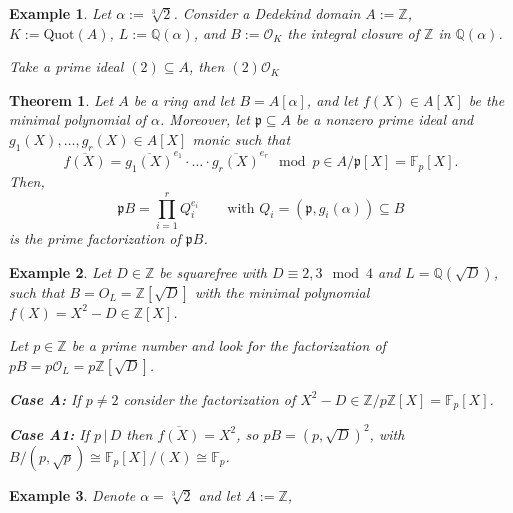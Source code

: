 \documentclass[a4paper]{book}
\theoremstyle{break}
\newtheorem{example}{Example}
\theoremstyle{plain}
\newtheorem{theorem}{Theorem}[definition]
\begin{document}
\begin{example}
    Let \(\alpha := \sqrt[3]{2}\). Consider a Dedekind domain \(A := \mathbb{Z}\), \(K := \text{Quot}(A)\), \(L := \mathbb{Q}(\alpha)\), and \(B := \mathcal{O}_K\) the integral closure of \(\mathbb{Z}\) in \(\mathbb{Q}(\alpha)\).

    Take a prime ideal \((2) \subseteq A\), then \((2) \mathcal{O}_K\)
\end{example}


\begin{theorem}
    Let \(A\) be a ring and let \(B = A[\alpha]\), and let \(f(X) \in A[X]\) be the minimal polynomial of \(\alpha\). Moreover, let \(\mathfrak{p} \subseteq A\) be a nonzero prime ideal and \(g_1(X), \ldots, g_r(X) \in A[X]\) monic such that
    \begin{equation}
        \overline{f(X)} = \overline{g_1(X)}^{e_1} \cdot \ldots \cdot \overline{g_r(X)}^{e_r} \mod{p} \in A / \mathfrak{p} [X] = \mathbb{F}_p [X] \text{.}
    \end{equation}
    Then,
    \begin{equation}
        \mathfrak{p}B = \prod_{i=1}^r Q_i^{e_i} \qquad \text{with } Q_i = (\mathfrak{p}, g_i(\alpha)) \subseteq B
    \end{equation}
    is the prime factorization of \(\mathfrak{p}B\).
\end{theorem}

\begin{example}
    Let \(D \in \mathbb{Z}\) be squarefree with \(D \equiv 2, 3 \mod{4}\) and \(L = \mathbb{Q}(\sqrt{D})\), such that \(B = O_L = \mathbb{Z}[\sqrt{D}]\) with the minimal polynomial \(f(X) = X^2 - D \in \mathbb{Z}[X]\).

    Let \(p \in \mathbb{Z}\) be a prime number and look for the factorization of \(pB = p \mathcal{O}_L = p \mathbb{Z}[\sqrt{D}]\).

    \noindent \textbf{Case A:} If \(p \neq 2\) consider the factorization of \(X^2 - D \in \mathbb{Z} / p \mathbb{Z} [X] = \mathbb{F}_p [X]\).

    \noindent \textbf{Case A1:} If \(p \, | \, D\) then \(\overline{f(X)} = X^2\), so \(pB = (p, \sqrt{D})^2\), with \(B / (p, \sqrt{p}) \cong \mathbb{F}_p[X]/(X) \cong \mathbb{F}_p\).
\end{example}

\begin{example}
    Denote \(\alpha = \sqrt[3]{2}\) and let \(A := \mathbb{Z}\), 
\end{example}
\end{document}
